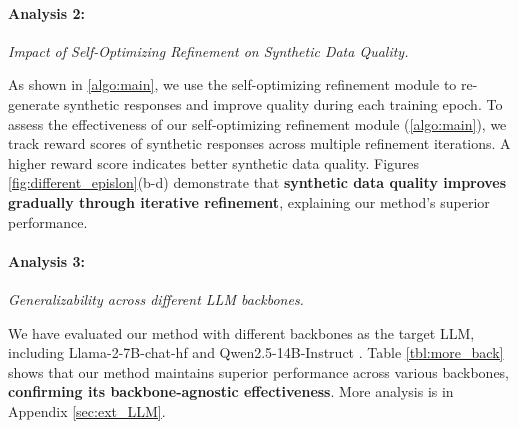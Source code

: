 \paragraph{Analysis 2:}\textit{Impact of Self-Optimizing Refinement on Synthetic Data Quality.}

As shown in \cref{algo:main}, we use the self-optimizing refinement module to re-generate synthetic responses and improve quality during each training epoch. 
To assess the effectiveness of our self-optimizing refinement module (\cref{algo:main}), we track reward scores of synthetic responses across multiple refinement iterations.
A higher reward score indicates better synthetic data quality. 
Figures \ref{fig:different_epislon}(b-d) demonstrate that \textbf{synthetic data quality improves gradually through iterative refinement}, explaining our method's superior performance.

\paragraph{Analysis 3:}\textit{Generalizability across different LLM backbones.}

We have evaluated our method with different backbones as the target LLM, including Llama-2-7B-chat-hf \cite{metaai2023llama2} and Qwen2.5-14B-Instruct \cite{yang2024qwen2}. 
Table \ref{tbl:more_back} shows that our method maintains superior performance across various backbones, \textbf{confirming its backbone-agnostic effectiveness}.
More analysis is in Appendix \ref{sec:ext_LLM}.

